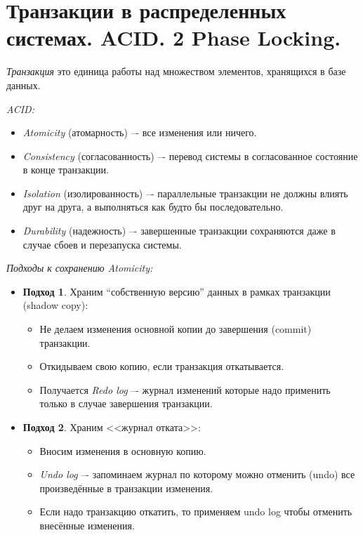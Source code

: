 \section{Транзакции в распределенных системах. ACID. 2 Phase Locking.}

\begin{definition}
    \textit{Транзакция} это единица работы над множеством элементов,
    хранящихся в базе данных.
\end{definition}

\begin{definition} \textit{ACID:}
    \begin{itemize}
        \item \textit{Atomicity} (атомарность) –- все изменения или ничего.
        \item \textit{Consistency} (согласованность) –- перевод системы в согласованное
            состояние в конце транзакции.
        \item \textit{Isolation} (изолированность) –- параллельные транзакции не
            должны влиять друг на друга, а выполняться как будто бы
            последовательно.
        \item \textit{Durability} (надежность) –- завершенные транзакции сохраняются
            даже в случае сбоев и перезапуска системы.
    \end{itemize}
\end{definition}

\begin{algorithm} \textit{Подходы к сохранению Atomicity:}
    \begin{itemize}
        \item \textbf{Подход 1}. Храним ``собственную версию'' данных в рамках 
            транзакции (shadow copy):
            \begin{itemize}
                \item Не делаем изменения основной копии до завершения (commit) 
                    транзакции.
                \item Откидываем свою копию, если транзакция откатывается.
                \item Получается \textit{Redo log} –- журнал изменений которые надо
                    применить только в случае завершения транзакции.
            \end{itemize}
        \item \textbf{Подход 2}. Храним <<журнал отката>>:
            \begin{itemize}
                \item Вносим изменения в основную копию.
                \item \textit{Undo log} –- запоминаем журнал по которому можно отменить
                    (undo) все произведённые в транзакции изменения.
                \item Если надо транзакцию откатить, то применяем undo log чтобы
                    отменить внесённые изменения.
            \end{itemize}
    \end{itemize}
\end{algorithm}

